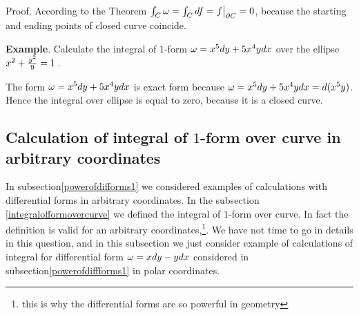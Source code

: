 \documentclass[12pt]{article}
\numberwithin{equation}{section}
\begin{document}
{\textsl{} Proof}. According to the Theorem
   $\int_C {\omega}=\int _C df= f\big\vert_{\partial C}=0$, because
the starting and ending points of closed curve coincide.




\m

 {\bf Example}.   Calculate the integral of $1$-form ${\omega}=x^5dy+5x^4ydx$ over the ellipse $x^2+{y^2\over 9}=1$\,.

    The form  ${\omega}=x^5dy+5x^4ydx$ is exact form because ${\omega}=x^5dy+5x^4ydx=d(x^5y)$. Hence the integral over ellipse
    is equal to zero, because it is a closed curve.

\subsection  {Calculation of integral of $1$-form over curve 
in arbitrary coordinates}


In subsection\ref{powerofdifforms1} we considered examples of calculations
with differential forms in arbitrary coordinates. 
In the subsection \ref{integralofformovercurve}
we defined the integral of $1$-form over curve. In fact the
definition is valid for an arbitrary coordinates,\footnote
{this is why the differential forms are so powerful
in geometry}. We have not time
to go in details in this question, and in this subsection we just
consider example of calculations of integral for differential form
   ${\omega}=xdy-ydx$ considered in subsection\ref{powerofdiffforms1} 
in polar coordinates.
\end{document}
